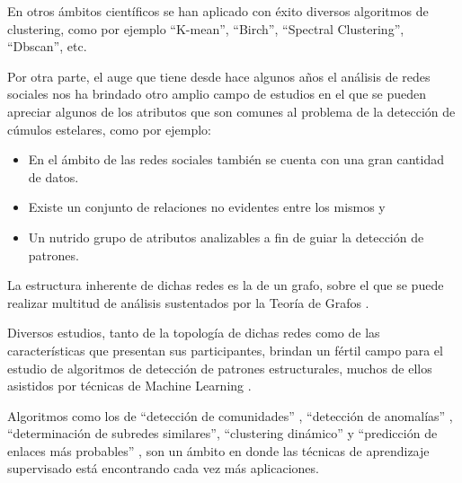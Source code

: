 \documentclass[
	11pt,oneside,a4paper
]{article}
\begin{document}
En otros ámbitos científicos se han aplicado con éxito diversos algoritmos de clustering, como por ejemplo “K-mean”, “Birch”, “Spectral Clustering”, “Dbscan”, etc.\parencite{rodriguez2019clustering}


Por otra parte, el auge que tiene desde hace algunos años el análisis de redes sociales nos ha brindado otro amplio campo de estudios en el que se pueden apreciar algunos de los atributos que son comunes al problema de la detección de cúmulos estelares, como por ejemplo:

\begin{itemize}
	\item En el ámbito de las redes sociales también se cuenta con una gran cantidad de datos.
	\item Existe un conjunto de relaciones no evidentes entre los mismos y
	\item Un nutrido grupo de atributos analizables a fin de guiar la detección de patrones.
\end{itemize}

La estructura inherente de dichas redes es la de un grafo, sobre el que se puede realizar multitud de análisis sustentados por la Teoría de Grafos \parencite{West2001}.

Diversos estudios, tanto de la topología de dichas redes \parencite{Barnes1983} como de las características que presentan sus participantes, brindan un fértil campo para el estudio de algoritmos de detección de patrones estructurales, muchos de ellos asistidos por técnicas de Machine Learning \parencite{Alharbi2021}.


Algoritmos como los de ``detección de comunidades'' \parencite{wang2015review}, ``detección de anomalías'' \parencite{kaur2016survey}, ``determinación de subredes similares'', ``clustering dinámico'' \parencite{boccaletti2007detecting} y ``predicción de enlaces más probables'' \parencite{kushwah2016review}, son un ámbito en donde las técnicas de aprendizaje supervisado está encontrando cada vez más aplicaciones.
\end{document}
